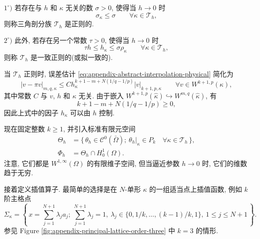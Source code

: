 \setcounter{statement}{1}
\begin{Definition}\label{def:appendix-regular-triangulation}
$1^\circ)$ 若存在与 $h$ 和 $\kappa$ 无关的数 $\sigma>0$, 使得当
$h\to0$ 时
\begin{equation}\label{eq:appendix-regular-triangulation}
\sigma_\kappa\leq\sigma
\qquad
\forall\kappa\in\mathcal{T}_h,
\end{equation}
则称三角剖分族 $\mathcal{T}_h$ 是正则的.

$2^\circ)$ 此外, 若存在另一个常数 $\tau>0$, 使得当 $h\to0$ 时
\begin{equation}\label{eq:appendix-uniformly-regular-triangulation}
\tau h\leq h_\kappa\leq\sigma\rho_\kappa
\qquad
\forall\kappa\in\mathcal{T}_h,
\end{equation}
则称 $\mathcal{T}_h$ 是一致正则的(或拟一致的).
\end{Definition}

\setcounter{statement}{0}
\begin{Remark}\label{rem:appendix-local-interpolation-estimate}
当 $\mathcal{T}_h$ 正则时, 误差估计
\eqref{eq:appendix-abstract-interpolation-physical} 简化为
\begin{equation}\label{eq:appendix-local-interpolation-estimate}
|v-\pi v|_{m,q,\kappa}
\leq
Ch_\kappa^{k+1-m+N(1/q-1/p)}
|v|_{k+1,p,\kappa}
\qquad
\forall v\in W^{k+1,p}(\kappa),
\end{equation}
其中常数 $C$ 与 $v$, $h$ 和 $\kappa$ 无关.
由于嵌入
$W^{k+1,p}(\hat\kappa)\hookrightarrow W^{m,q}(\hat\kappa)$,
有
\[
k+1-m+N(1/q-1/p)\geq0,
\]
因此上式中的因子 $h_\kappa$ 可以由 $h$ 控制.
\end{Remark}

现在固定整数 $k\geq1$, 并引入标准有限元空间
\begin{equation}\label{eq:appendix-standard-triangular-fem-spaces}
\begin{aligned}
\Theta_h
&=
\{\,\theta_h\in\mathcal{C}^0(\bar\Omega);
\ \theta_h|_\kappa\in P_k
\quad\forall\kappa\in\mathcal{T}_h\,\},\\
\Phi_h
&=
\Theta_h\cap H_0^1(\Omega).
\end{aligned}
\end{equation}
注意, 它们都是 $W^{1,\infty}(\Omega)$ 的有限维子空间,
但当逼近参数 $h\to0$ 时, 它们的维数趋于无穷.

接着定义插值算子. 最简单的选择是在 $N$-单形 $\kappa$
的一组适当点上插值函数, 例如 $k$ 阶主格点
\begin{equation}\label{eq:appendix-principal-lattice-simplex}
\Sigma_\kappa
=
\left\{\,
x=\sum_{j=1}^{N+1}\lambda_ja_j;
\ \sum_{j=1}^{N+1}\lambda_j=1,
\ \lambda_j\in\{0,1/k,\ldots,(k-1)/k,1\},
\ 1\leq j\leq N+1
\,\right\}.
\end{equation}
参见 Figure \ref{fig:appendix-principal-lattice-order-three} 中 $k=3$ 的情形.

